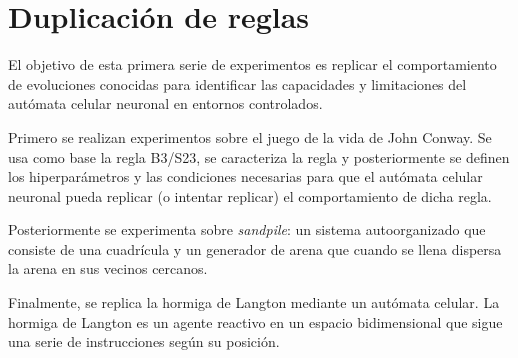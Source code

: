 \section{Duplicación de reglas}

El objetivo de esta primera serie de experimentos es replicar el comportamiento de evoluciones conocidas para identificar las capacidades y limitaciones del autómata celular neuronal en entornos controlados. 

Primero se realizan experimentos sobre el juego de la vida de John Conway. Se usa como base la regla B3/S23, se caracteriza la regla y posteriormente se definen los hiperparámetros y las condiciones necesarias para que el autómata celular neuronal pueda replicar (o intentar replicar) el comportamiento de dicha regla. 

Posteriormente se experimenta sobre \textit{sandpile}: un sistema autoorganizado que consiste de una cuadrícula y un generador de arena que cuando se llena dispersa la arena en sus vecinos cercanos. 

Finalmente, se replica la hormiga de Langton mediante un autómata celular. La hormiga de Langton es un agente reactivo en un espacio bidimensional que sigue una serie de instrucciones según su posición.